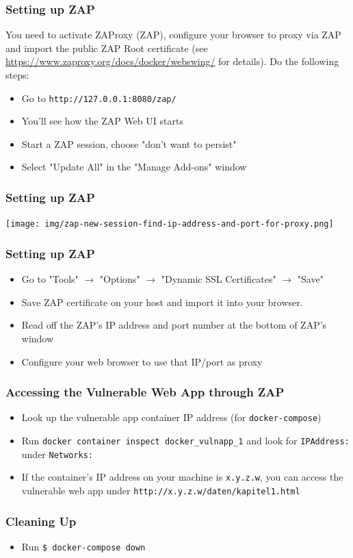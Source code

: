 \begin{frame}[fragile]
	\frametitle{Setting up ZAP}
	You need to activate ZAProxy (ZAP), configure your browser to proxy via ZAP and import the public ZAP Root certificate (see \url{https://www.zaproxy.org/docs/docker/webswing/} for details). Do the following steps:
	\begin{itemize}
		\item Go to \verb|http://127.0.0.1:8080/zap/|
		\item You'll see how the ZAP Web UI starts
		\item Start a ZAP session, choose "don't want to persist"
		\item Select "Update All" in the "Manage Add-ons" window
	\end{itemize}
\end{frame}

\begin{frame}
	\frametitle{Setting up ZAP}
	\centering
	\texttt{[image: img/zap-new-session-find-ip-address-and-port-for-proxy.png]}
\end{frame}

\begin{frame}
	\frametitle{Setting up ZAP}
	\begin{itemize}
		\item Go to "Tools" $\rightarrow$ "Options" $\rightarrow$ "Dynamic SSL Certificates" $\rightarrow$ "Save"
		\item Save ZAP certificate on your host and import it into your browser.
		\item Read off the ZAP's IP address and port number at the bottom of ZAP's window
		\item Configure your web browser to use that IP/port as proxy
	\end{itemize}
\end{frame}

\begin{frame}[fragile]
	\frametitle{Accessing the Vulnerable Web App through ZAP}
	\begin{itemize}
		\item Look up the vulnerable app container IP address (for \texttt{docker-compose})
		\item Run \verb|docker container inspect docker_vulnapp_1| and look for \verb|IPAddress:| under \verb|Networks:|
		\item If the container's IP address on your machine is \verb|x.y.z.w|, you can access the vulnerable web app under \verb|http://x.y.z.w/daten/kapitel1.html|
	\end{itemize}
\end{frame}

\begin{frame}[fragile]
	\frametitle{Cleaning Up}
	\begin{itemize}
		\item Run \verb|$ docker-compose down|
	\end{itemize}
\end{frame}